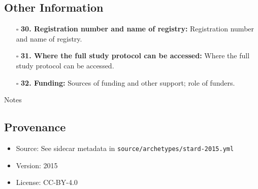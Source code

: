 \documentclass[11pt]{article}
\def\tightlist{}
\begin{document}
\begin{Form}
\subsection{Other Information}\label{other-information}

\begin{itemize}
\tightlist
\item[$\square$]
  \textbf{30. Registration number and name of registry:} Registration
  number and name of registry.
\item[$\square$]
  \textbf{31. Where the full study protocol can be accessed:} Where the
  full study protocol can be accessed.
\item[$\square$]
  \textbf{32. Funding:} Sources of funding and other support; role of
  funders.
\end{itemize}

{Notes}

\subsection{Provenance}\label{provenance}

\begin{itemize}
\tightlist
\item
  Source: See sidecar metadata in
  \texttt{source/archetypes/stard-2015.yml}
\item
  Version: 2015
\item
  License: CC-BY-4.0
\end{itemize}

\end{Form}
\end{document}
